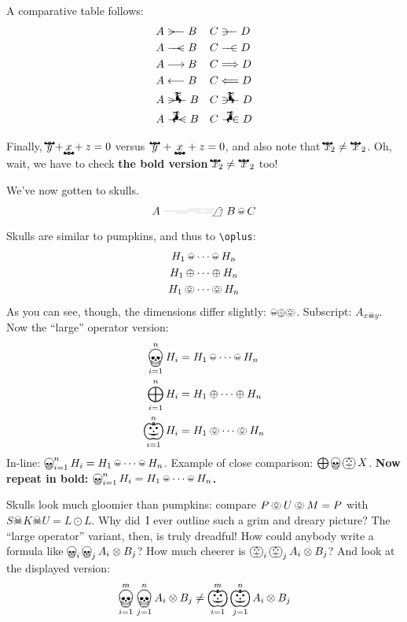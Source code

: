 \documentclass[a4paper]{article}
\begin{document}
A comparative table follows:
\begin{align*}
	A &\rightbroom B   &   C &\hmrightpitchfork D \\
	A &\leftbroom  B   &   C &\hmleftpitchfork  D \\
	A &\longrightarrow B   &   C &\Longrightarrow D \\
	A &\longleftarrow  B   &   C &\Longleftarrow  D \\
	A &\xrightwitchonbroom{} B   &   C &\xrightwitchonpitchfork{} D \\
	A &\xleftwitchonbroom{}  B   &   C &\xleftwitchonpitchfork{}  D \\
\end{align*}

Finally, \( \overbat{y} + \underbat{x} + z = 0 \) versus \( \overbat*{y} +
\underbat*{x} + z = 0 \), and also note that \( {\overbat{x}}_{2} \ne
{\overbat*{x}}_{2} \).  Oh, wait, we have to check {\bfseries\boldmath the bold
version \( {\overbat{x}}_{2} \ne {\overbat*{x}}_{2} \)} too!

\bigbreak

We've now gotten to skulls.
\[ A \xrightswishingghost{\mspace{100mu}} B \skull C \]

Skulls are similar to pumpkins, and thus to \verb|\oplus|:
\begin{gather*}
	H_{1} \skull   \dots \skull   H_{n} \\
	H_{1} \oplus   \dots \oplus   H_{n} \\
	H_{1} \pumpkin \dots \pumpkin H_{n}
\end{gather*}
As you can see, though, the dimensions differ slightly:
\( {\skull}{\oplus}{\pumpkin} \).
Subscript: \( A_{x\skull y} \).
Now the ``large'' operator version:
\begin{align*}
	\bigskull  _{i=1}^{n} H_{i} &= H_{1} \skull   \dots \skull   H_{n} \\
	\bigoplus  _{i=1}^{n} H_{i} &= H_{1} \oplus   \dots \oplus   H_{n} \\
	\bigpumpkin_{i=1}^{n} H_{i} &= H_{1} \pumpkin \dots \pumpkin H_{n}
\end{align*}
In-line: \( \bigskull_{i=1}^{n} H_{i} = H_{1}\skull\dots\skull H_{n} \).
Example of close comparison: \( \bigoplus\bigskull\bigpumpkin X \).
{\bfseries\boldmath Now repeat in bold: \( \bigskull_{i=1}^{n} H_{i} =
H_{1}\skull\dots\skull H_{n} \).}

Skulls look much gloomier than pumpkins: compare \( P\pumpkin U\pumpkin M = P \)
with \( S\skull K\skull U = L\odot L \).  Why did~I ever outline such a grim and
dreary picture?  The ``large operator'' variant, then, is truly dreadful!  How
could anybody write a formula like \( \bigskull_{i}\bigskull_{j} A_{i}\otimes
B_{j} \)?  How much cheerer is \( \bigpumpkin_{i}\bigpumpkin_{j} A_{i}\otimes
B_{j} \)?  And look at the displayed version:
\[
	\bigskull_{i=1}^{m}\bigskull_{j=1}^{n} A_{i}\otimes B_{j} \neq
	\bigpumpkin_{i=1}^{m}\bigpumpkin_{j=1}^{n} A_{i}\otimes B_{j}
\]
\end{document}

